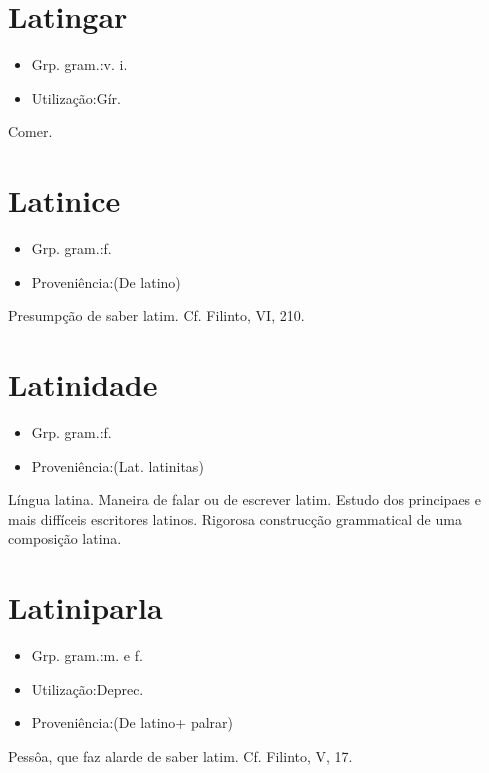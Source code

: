 \section{Latingar}
\begin{itemize}
\item {Grp. gram.:v. i.}
\end{itemize}
\begin{itemize}
\item {Utilização:Gír.}
\end{itemize}
Comer.
\section{Latinice}
\begin{itemize}
\item {Grp. gram.:f.}
\end{itemize}
\begin{itemize}
\item {Proveniência:(De \textunderscore latino\textunderscore )}
\end{itemize}
Presumpção de saber latim. Cf. Filinto, VI, 210.
\section{Latinidade}
\begin{itemize}
\item {Grp. gram.:f.}
\end{itemize}
\begin{itemize}
\item {Proveniência:(Lat. \textunderscore latinitas\textunderscore )}
\end{itemize}
Língua latina.
Maneira de falar ou de escrever latim.
Estudo dos principaes e mais diffíceis escritores latinos.
Rigorosa construcção grammatical de uma composição latina.
\section{Latiniparla}
\begin{itemize}
\item {Grp. gram.:m.  e  f.}
\end{itemize}
\begin{itemize}
\item {Utilização:Deprec.}
\end{itemize}
\begin{itemize}
\item {Proveniência:(De \textunderscore latino\textunderscore  + \textunderscore palrar\textunderscore )}
\end{itemize}
Pessôa, que faz alarde de saber latim. Cf. Filinto, V, 17.
